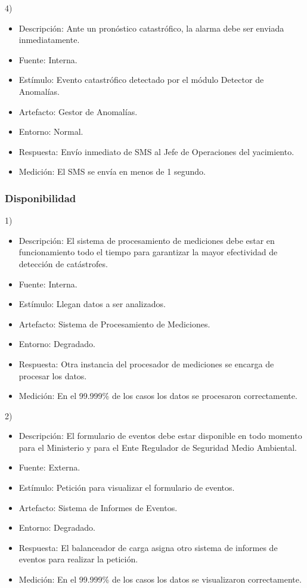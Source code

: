 \documentclass{article}
\theoremstyle{definition}
\theoremstyle{remark}
\begin{document}
\pagebreak

4)
\begin{itemize}
  \item Descripción: Ante un pronóstico catastrófico, la alarma debe ser enviada inmediatamente.
  \item Fuente: Interna.
  \item Estímulo: Evento catastrófico detectado por el módulo Detector de Anomalías.
  \item Artefacto: Gestor de Anomalías.
  \item Entorno: Normal.
  \item Respuesta: Envío inmediato de SMS al Jefe de Operaciones del yacimiento.
  \item Medición: El SMS se envía en menos de 1 segundo.
\end{itemize}

\subsubsection{Disponibilidad}

1)
\begin{itemize}
  \item Descripción: El sistema de procesamiento de mediciones debe estar en funcionamiento todo el tiempo para garantizar la mayor efectividad de detección de catástrofes.
  \item Fuente: Interna.
  \item Estímulo: Llegan datos a ser analizados.
  \item Artefacto: Sistema de Procesamiento de Mediciones.
  \item Entorno: Degradado.
  \item Respuesta: Otra instancia del procesador de mediciones se encarga de procesar los datos.
  \item Medición: En el 99.999\% de los casos los datos se procesaron correctamente.
\end{itemize}

2)
\begin{itemize}
  \item Descripción: El formulario de eventos debe estar disponible en todo momento para el Ministerio y para el Ente Regulador de Seguridad Medio Ambiental.
  \item Fuente: Externa.
  \item Estímulo: Petición para visualizar el formulario de eventos.
  \item Artefacto: Sistema de Informes de Eventos.
  \item Entorno: Degradado.
  \item Respuesta: El balanceador de carga asigna otro sistema de informes de eventos para realizar la petición.
  \item Medición: En el 99.999\% de los casos los datos se visualizaron correctamente.
\end{itemize}
\end{document}
